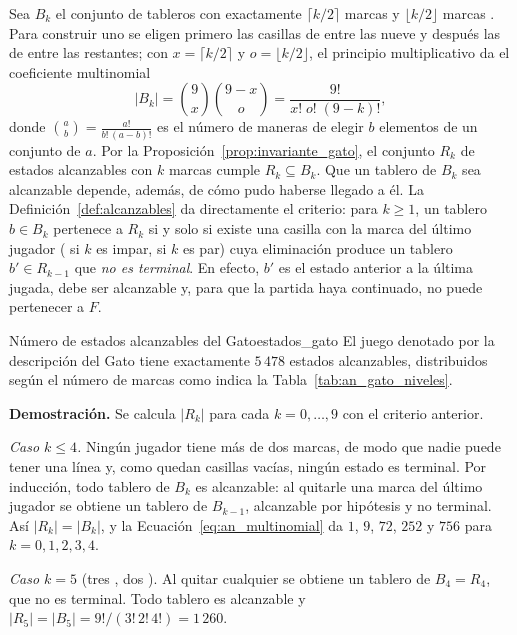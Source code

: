 Sea $B_k$ el conjunto de tableros con exactamente $\lceil k/2 \rceil$ marcas  y $\lfloor k/2 \rfloor$ marcas . Para construir uno se eligen primero las casillas de  entre las nueve y después las de  entre las restantes; con $x = \lceil k/2 \rceil$ y $o = \lfloor k/2 \rfloor$, el principio multiplicativo da el coeficiente multinomial
\begin{equation}
    |B_k| = \binom{9}{x}\binom{9-x}{o} = \frac{9!}{x!\; o!\; (9-k)!},
    \label{eq:an_multinomial}
\end{equation}
donde $\binom{a}{b} = \frac{a!}{b!\,(a-b)!}$ es el número de maneras de elegir $b$ elementos de un conjunto de $a$. Por la Proposición~\ref{prop:invariante_gato}, el conjunto $R_k$ de estados alcanzables con $k$ marcas cumple $R_k \subseteq B_k$. Que un tablero de $B_k$ sea alcanzable depende, además, de cómo pudo haberse llegado a él. La Definición~\ref{def:alcanzables} da directamente el criterio: para $k \ge 1$, un tablero $b \in B_k$ pertenece a $R_k$ si y solo si existe una casilla con la marca del último jugador ( si $k$ es impar,  si $k$ es par) cuya eliminación produce un tablero $b' \in R_{k-1}$ que \emph{no es terminal}. En efecto, $b'$ es el estado anterior a la última jugada, debe ser alcanzable y, para que la partida haya continuado, no puede pertenecer a $F$.

\begin{proposicion}{Número de estados alcanzables del Gato}{estados_gato}
El juego denotado por la descripción del Gato tiene exactamente $5\,478$ estados alcanzables, distribuidos según el número de marcas como indica la Tabla~\ref{tab:an_gato_niveles}.
\end{proposicion}

\noindent\textbf{Demostración.} Se calcula $|R_k|$ para cada $k = 0, \dots, 9$ con el criterio anterior.

\emph{Caso $k \le 4$.} Ningún jugador tiene más de dos marcas, de modo que nadie puede tener una línea y, como quedan casillas vacías, ningún estado es terminal. Por inducción, todo tablero de $B_k$ es alcanzable: al quitarle una marca del último jugador se obtiene un tablero de $B_{k-1}$, alcanzable por hipótesis y no terminal. Así $|R_k| = |B_k|$, y la Ecuación~\eqref{eq:an_multinomial} da $1$, $9$, $72$, $252$ y $756$ para $k = 0, 1, 2, 3, 4$.

\emph{Caso $k = 5$} (tres , dos ). Al quitar cualquier  se obtiene un tablero de $B_4 = R_4$, que no es terminal. Todo tablero es alcanzable y $|R_5| = |B_5| = 9!/(3!\,2!\,4!) = 1\,260$.

